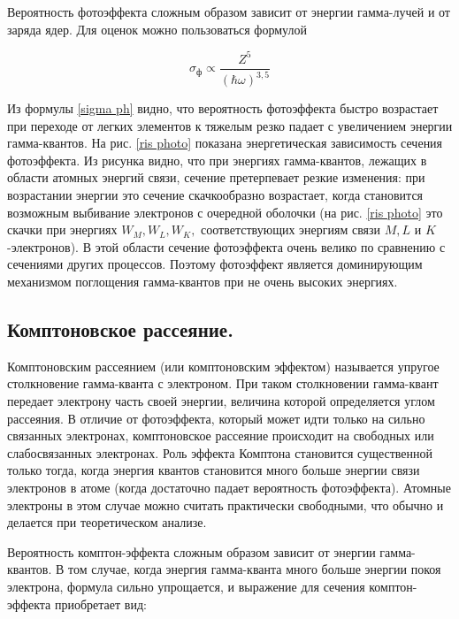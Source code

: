 \documentclass[a4paper,12pt]{article} %
\begin{document}
	\medskip
	
\noindent Вероятность фотоэффекта сложным образом зависит от энергии
	гамма-лучей и от заряда ядер. Для оценок можно пользоваться формулой
	
	\begin{equation}\label{sigma ph}
	\sigma_\text{ф} \propto \dfrac{Z^5}{(\hbar\omega)^{3,5}}
	\end{equation}
	
\noindent Из формулы \eqref{sigma ph} видно, что вероятность фотоэффекта быстро возрастает при переходе от легких элементов к тяжелым резко падает с увеличением энергии гамма-квантов. На рис. \ref{ris photo} показана энергетическая зависимость сечения фотоэффекта. Из рисунка видно, что при энергиях гамма-квантов, лежащих в области атомных энергий связи, сечение претерпевает резкие изменения: при возрастании энергии это сечение скачкообразно возрастает, когда становится возможным выбивание электронов с очередной оболочки (на рис. \ref{ris photo} это скачки при энергиях $ W_M, W_L, W_K, $ соответствующих энергиям связи $ M, L $  и $ K $-электронов). В этой области сечение фотоэффекта очень велико по сравнению с сечениями других процессов. Поэтому фотоэффект является доминирующим механизмом поглощения гамма-квантов при не очень высоких энергиях.
	
	\subsection{Комптоновское рассеяние.}
\noindent Комптоновским рассеянием (или комптоновским эффектом) называется упругое столкновение гамма-кванта с электроном. При таком столкновении гамма-квант передает электрону часть своей энергии, величина которой определяется углом рассеяния. В отличие от фотоэффекта, который может идти только на сильно связанных электронах, комптоновское рассеяние происходит на свободных или слабосвязанных электронах. Роль эффекта Комптона становится
	существенной только тогда, когда энергия квантов становится много
	больше энергии связи электронов в атоме (когда достаточно падает
	вероятность фотоэффекта). Атомные электроны в этом случае можно
	считать практически свободными, что обычно и делается при теоретическом анализе.
	
	\medskip
	
\noindent Вероятность комптон-эффекта сложным образом зависит от энергии гамма-квантов. В том случае, когда энергия
	гамма-кванта много больше энергии покоя электрона, формула сильно
	упрощается, и выражение для сечения комптон-эффекта приобретает  вид:
	
\end{document}
